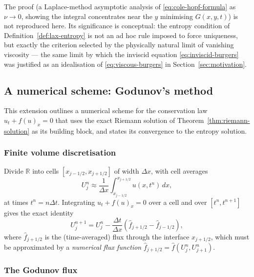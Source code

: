 The proof (a Laplace-method asymptotic analysis of
\eqref{eq:cole-hopf-formula} as $\nu\to0$, showing the integral
concentrates near the $y$ minimising $G(x,y,t)$) is not reproduced here.
Its significance is conceptual: the entropy condition of
Definition~\ref{def:lax-entropy} is not an ad hoc rule imposed to force
uniqueness, but exactly the criterion selected by the physically natural
limit of vanishing viscosity --- the same limit by which the inviscid
equation \eqref{eq:inviscid-burgers} was justified as an idealisation of
\eqref{eq:viscous-burgers} in Section~\ref{sec:motivation}.

\subsection{A numerical scheme: Godunov's method}
\label{subsec:godunov}

This extension outlines a numerical scheme for the conservation law
$u_t+f(u)_x=0$ that uses the exact Riemann solution of
Theorem~\ref{thm:riemann-solution} as its building block, and states its
convergence to the entropy solution.

\subsubsection{Finite volume discretisation}
\label{subsubsec:finite-volume}

Divide $\mathbb{R}$ into cells $[x_{j-1/2}, x_{j+1/2}]$ of width $\Delta
x$, with cell averages
\begin{equation}
  U_j^n \approx \frac{1}{\Delta x}\int_{x_{j-1/2}}^{x_{j+1/2}} u(x, t^n)\, dx,
\end{equation}
at times $t^n = n\Delta t$. Integrating $u_t+f(u)_x=0$ over a cell and
over $[t^n,t^{n+1}]$ gives the exact identity
\begin{equation}
  U_j^{n+1} = U_j^n - \frac{\Delta t}{\Delta x}
  \left( \widehat{f}_{j+1/2} - \widehat{f}_{j-1/2} \right),
\end{equation}
where $\widehat f_{j+1/2}$ is the (time-averaged) flux through the
interface $x_{j+1/2}$, which must be approximated by a \emph{numerical
flux function} $\widehat f_{j+1/2} = \widehat f(U_j^n, U_{j+1}^n)$.

\subsubsection{The Godunov flux}
\label{subsubsec:godunov-flux}

